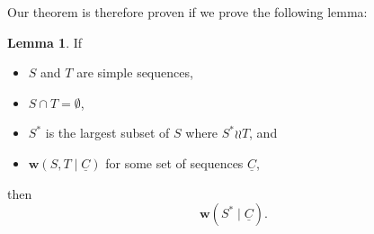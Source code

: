 \documentclass[12pt]{article}
\newcommand{\indep}{\mathrel{\wr\wr}} %
\newcommand{\workssign}{\mathbf{w}}
\newcommand{\worksc}[2]{\workssign({#1}\mathrel{|}{#2})}
\newcommand{\seqset}[1]{\underline{#1}} %
\theoremstyle{definition}
\newtheorem{mylem}{Lemma}
\begin{document}
Our theorem is therefore proven if we prove the following lemma:
\newcommand{\condSimple}{(c1)}
\newcommand{\condDisj}{(c2)}
\newcommand{\condApr}{(c3)}
\newcommand{\condWork}{(c4)}
\begin{mylem}
If
   \begin{itemize}
   \item[\condSimple] $S$ and $T$ are simple sequences,
   \item[\condDisj] $S\cap T=\emptyset$,
   \item[\condApr] $S^*$ is the largest subset of $S$ where $S^*\indep T$, and
   \item[\condWork] $\worksc{S,T}{\seqset{C}}$ for some set of sequences $\seqset{C}$,
   \end{itemize}
then
\[ \worksc{S^*}{\seqset{C}}. \]
\end{mylem}
\end{document}
